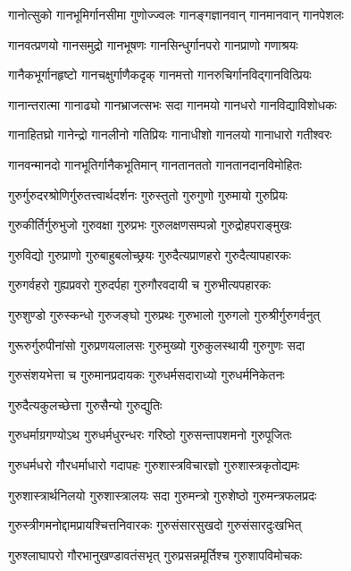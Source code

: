 \twolineshloka
{गानोत्सुको गानभूमिर्गानसीमा गुणोज्ज्वलः}%
{गानङ्गज्ञानवान् गानमानवान् गानपेशलः}%

\twolineshloka
{गानवत्प्रणयो गानसमुद्रो गानभूषणः}%
{गानसिन्धुर्गानपरो गानप्राणो गणाश्रयः}%

\twolineshloka
{गानैकभूर्गानहृष्टो गानचक्षुर्गाणैकदृक्}%
{गानमत्तो गानरुचिर्गानविद्गानवित्प्रियः}%

\twolineshloka
{गानान्तरात्मा गानाढ्यो गानभ्राजत्सभः सदा}%
{गानमयो गानधरो गानविद्याविशोधकः}%

\twolineshloka
{गानाहितघ्रो गानेन्द्रो गानलीनो गतिप्रियः}%
{गानाधीशो गानलयो गानाधारो गतीश्वरः}%

\twolineshloka
{गानवन्मानदो गानभूतिर्गानैकभूतिमान्}%
{गानतानततो गानतानदानविमोहितः}%

\twolineshloka
{गुरुर्गुरुदरश्रोणिर्गुरुतत्त्वार्थदर्शनः}%
{गुरुस्तुतो गुरुगुणो गुरुमायो गुरुप्रियः}%

\twolineshloka
{गुरुकीर्तिर्गुरुभुजो गुरुवक्षा गुरुप्रभः}%
{गुरुलक्षणसम्पन्नो गुरुद्रोहपराङ्मुखः}%

\twolineshloka
{गुरुविद्यो गुरुप्राणो गुरुबाहुबलोच्छ्रयः}%
{गुरुदैत्यप्राणहरो गुरुदैत्यापहारकः}%

\twolineshloka
{गुरुगर्वहरो गुह्यप्रवरो गुरुदर्पहा}%
{गुरुगौरवदायी च गुरुभीत्यपहारकः}%

\twolineshloka
{गुरुशुण्डो गुरुस्कन्धो गुरुजङ्घो गुरुप्रथः}%
{गुरुभालो गुरुगलो गुरुश्रीर्गुरुगर्वनुत्}

\twolineshloka
{गुरूरुर्गुरुपीनांसो गुरुप्रणयलालसः}%
{गुरुमुख्यो गुरुकुलस्थायी गुरुगुणः सदा}%

\twolineshloka
{गुरुसंशयभेत्ता च गुरुमानप्रदायकः}%
{गुरुधर्मसदाराध्यो गुरुधर्मनिकेतनः}%

\onelineshloka
{गुरुदैत्यकुलच्छेत्ता गुरुसैन्यो गुरुद्युतिः}%

\twolineshloka
{गुरुधर्माग्रगण्योऽथ गुरुधर्मधुरन्धरः}%
{गरिष्ठो गुरुसन्तापशमनो गुरुपूजितः}%

\twolineshloka
{गुरुधर्मधरो गौरधर्माधारो गदापहः}%
{गुरुशास्त्रविचारज्ञो गुरुशास्त्रकृतोद्यमः}%

\twolineshloka
{गुरुशास्त्रार्थनिलयो गुरुशास्त्रालयः सदा}%
{गुरुमन्त्रो गुरुशेष्ठो गुरुमन्त्रफलप्रदः}%

\twolineshloka
{गुरुस्त्रीगमनोद्दामप्रायश्चित्तनिवारकः}%
{गुरुसंसारसुखदो गुरुसंसारदुःखभित्}%

\twolineshloka
{गुरुश्लाघापरो गौरभानुखण्डावतंसभृत्}%
{गुरुप्रसन्नमूर्तिश्च गुरुशापविमोचकः}%

